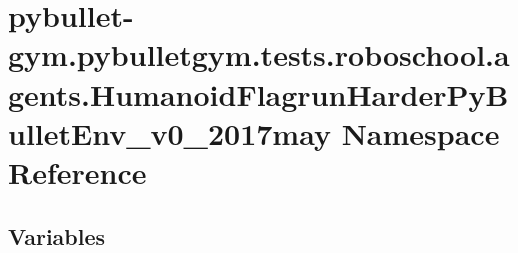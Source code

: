 \hypertarget{namespacepybullet-gym_1_1pybulletgym_1_1tests_1_1roboschool_1_1agents_1_1_humanoid_flagrun_harder_py_bullet_env__v0__2017may}{}\section{pybullet-\/gym.pybulletgym.\+tests.\+roboschool.\+agents.\+Humanoid\+Flagrun\+Harder\+Py\+Bullet\+Env\+\_\+v0\+\_\+2017may Namespace Reference}
\label{namespacepybullet-gym_1_1pybulletgym_1_1tests_1_1roboschool_1_1agents_1_1_humanoid_flagrun_harder_py_bullet_env__v0__2017may}
\subsection*{Variables}
